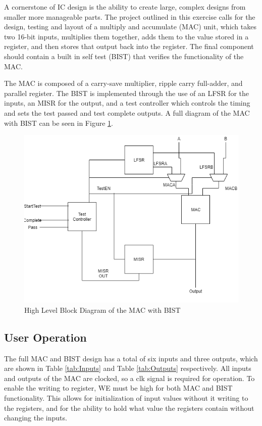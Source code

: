 \documentclass[11pt]{article}
\begin{document}
	A cornerstone of IC design is the ability to create large, complex designs from smaller more manageable parts. The project outlined in this exercise calls for the design, testing and layout of a multiply and accumulate (MAC) unit, which takes two 16-bit inputs, multiplies them together, adds them to the value stored in a register, and then stores that output back into the register. The final component should contain a built in self test (BIST) that verifies the functionality of the MAC.
	
	The MAC is composed of a carry-save multiplier, ripple carry full-adder, and parallel register. The BIST is implemented through the use of an LFSR for the inputs, an MISR for the output, and a test controller which controls the timing and sets the test passed and test complete outputs. A full diagram of the MAC with BIST can be seen in Figure \ref{fig:full-project-block}.
	
	\begin{figure}[H]
		\centering
		\includegraphics[width=0.7\linewidth]{Pictures/Full-Project-Block}
		\caption{High Level Block Diagram of the MAC with BIST}
		\label{fig:full-project-block}
	\end{figure}


	\subsection{User Operation}
		The full MAC and BIST design has a total of six inputs and three outputs, which are shown in Table \ref{tab:Inputs} and Table \ref{tab:Outputs} respectively. All inputs and outputs of the MAC are clocked, so a clk signal is required for operation. To enable the writing to register, WE must be high for both MAC and BIST functionality. This allows for initialization of input values without it writing to the registers, and for the ability to hold what value the registers contain without changing the inputs. 
		
\end{document}
